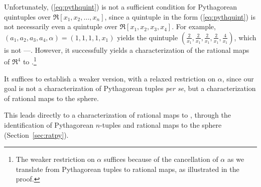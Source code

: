 \documentclass[11pt]{article}
\begin{document}
{   Unfortunately, 
   (\ref{eq:pythquint}) is not a sufficient condition for Pythagorean quintuples
   over $\Re[x_1,x_2,\ldots,x_n]$, since
   a quintuple in the form (\ref{eq:pythquint}) is not necessarily
   even a quintuple over $\Re[x_1,x_2,x_3,x_4]$.
   For example, $(a_1,a_2,a_3,a_4,\alpha) = (1,1,1,1,x_1)$ yields the
   quintuple $(\frac{2}{x_1}, \frac{2}{x_1}, \frac{2}{x_1}, \frac{2}{x_1}, \frac{4}{x_1})$,
   which is not ---.
   However, it successfully yields a characterization
   of the rational maps of $\Re^4$ to .\footnote{The weaker restriction on $\alpha$
     suffices because of the cancellation of $\alpha$ as we translate from Pythagorean
     tuples to rational maps, as illustrated in the proof.}

   It suffices to establish a weaker version,
   with a relaxed restriction on $\alpha$,
   since our goal is not a characterization of Pythagorean tuples {\em per se},
   but a characterization of rational maps to the sphere.
} %

This leads directly to a characterization of rational maps to , through the
identification of Pythagorean $n$-tuples and rational maps to the sphere 
(Section~\ref{sec:ratpy}).
\end{document}
